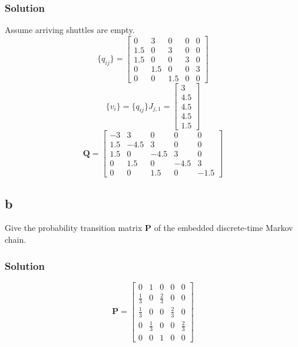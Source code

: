 \documentclass[letterpaper]{amsart}
\begin{document}
\subsubsection*{Solution}
Assume arriving shuttles are empty.
\begin{equation}
  \{q_{ij}\}=
\begin{bmatrix}
  0 & 3 & 0 & 0 & 0 \\
  1.5 & 0 & 3 & 0 & 0 \\
  1.5 & 0 & 0 & 3 & 0 \\
  0 & 1.5 & 0 & 0 & 3 \\
  0 & 0 & 1.5 & 0 & 0
\end{bmatrix}
\end{equation}
\begin{equation}
  \{v_i\}=
  \{q_{ij}\}J_{j,1} =
\begin{bmatrix}
  3 \\ 4.5 \\ 4.5 \\ 4.5 \\ 1.5
\end{bmatrix}
\end{equation}
\begin{equation}
  \mathbf{Q} =
\begin{bmatrix}
  -3 & 3 & 0 & 0 & 0 \\
  1.5 & -4.5 & 3 & 0 & 0 \\
  1.5 & 0 & -4.5 & 3 & 0 \\
  0 & 1.5 & 0 & -4.5 & 3 \\
  0 & 0 & 1.5 & 0 & -1.5
\end{bmatrix}
\end{equation}
\subsection*{b}
Give the probability transition matrix $\mathbf{P}$ of the embedded discrete-time
Markov chain.
\subsubsection*{Solution}
\begin{equation}
  \mathbf{P} =
\begin{bmatrix}
  0 & 1 & 0 & 0 & 0 \\
  \frac{1}{3} & 0 & \frac{2}{3} & 0 & 0 \\
  \frac{1}{3} & 0 & 0 & \frac{2}{3} & 0 \\
  0 & \frac{1}{3} & 0 & 0 & \frac{2}{3} \\
  0 & 0 & 1 & 0 & 0
\end{bmatrix}
\end{equation}
\end{document}
